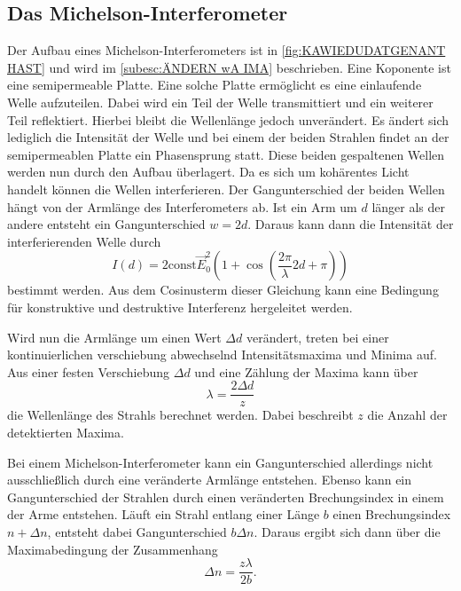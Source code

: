 \subsection{Das Michelson-Interferometer}
\label{subsec:Interferometer}
Der Aufbau eines Michelson-Interferometers ist in \autoref{fig:KAWIEDUDATGENANT HAST} und wird im \autoref{subesc:ÄNDERN wA IMA} beschrieben. Eine Koponente ist eine
semipermeable Platte. Eine solche Platte ermöglicht es eine einlaufende Welle aufzuteilen. Dabei wird ein Teil der Welle transmittiert und ein weiterer Teil reflektiert. 
Hierbei bleibt die Wellenlänge jedoch unverändert. Es ändert sich lediglich die Intensität der Welle und bei einem der beiden Strahlen findet an der semipermeablen Platte
ein Phasensprung statt. Diese beiden gespaltenen Wellen werden nun durch den Aufbau überlagert. Da es sich um kohärentes Licht handelt können die Wellen interferieren. 
Der Gangunterschied der beiden Wellen hängt von der Armlänge des Interferometers ab. Ist ein Arm um $d$ länger als der andere entsteht ein Gangunterschied $w = 2d$.
Daraus kann dann die Intensität der interferierenden Welle durch
\begin{equation*}
    I(d) = 2\text{const}\vec{E}_0^2\left(1 + \cos\left(\frac{2\pi}{\lambda}2d + \pi\right)\right)
\end{equation*}
bestimmt werden. Aus dem Cosinusterm dieser Gleichung kann eine Bedingung für konstruktive und destruktive Interferenz hergeleitet werden. 

Wird nun die Armlänge um einen Wert $\Delta d$ verändert, treten bei einer kontinuierlichen verschiebung abwechselnd Intensitätsmaxima und Minima auf. Aus einer festen 
Verschiebung $\Delta d$ und eine Zählung der Maxima kann über 
\begin{equation}
    \label{eqn:lambda}
    \lambda = \frac{2 \Delta d}{z}
\end{equation}
die Wellenlänge des Strahls berechnet werden. Dabei beschreibt $z$ die Anzahl der detektierten Maxima.

Bei einem Michelson-Interferometer kann ein Gangunterschied allerdings nicht ausschließlich durch eine veränderte Armlänge entstehen. Ebenso kann ein Gangunterschied der Strahlen
durch einen veränderten Brechungsindex in einem der Arme entstehen. Läuft ein Strahl entlang einer Länge $b$ einen Brechungsindex $n + \Delta n$, entsteht dabei
Gangunterschied $b\Delta n$. Daraus ergibt sich dann über die Maximabedingung der Zusammenhang  
\begin{equation}
    \label{eqn:Brechungsindex}
    \Delta n = \frac{z\lambda}{2b}.
\end{equation}

